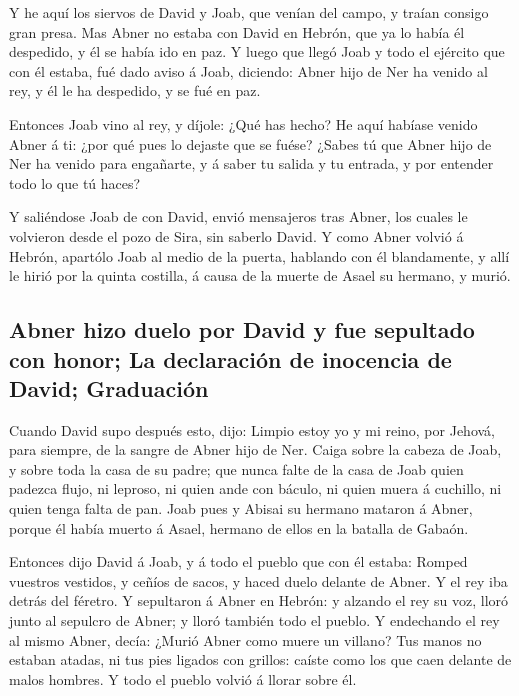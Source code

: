  Y he aquí los siervos de David y Joab, que venían del
campo, y traían consigo gran presa. Mas Abner no estaba con David en
Hebrón, que ya lo había él despedido, y él se había ido en paz.
 Y luego que llegó Joab y todo el ejército que con él
estaba, fué dado aviso á Joab, diciendo: Abner hijo de Ner ha venido al
rey, y él le ha despedido, y se fué en paz.

 Entonces Joab vino al rey, y díjole: ¿Qué has hecho? He
aquí habíase venido Abner á ti: ¿por qué pues lo dejaste que se fuése?
 ¿Sabes tú que Abner hijo de Ner ha venido para
engañarte, y á saber tu salida y tu entrada, y por entender todo lo que
tú haces?

 Y saliéndose Joab de con David, envió mensajeros tras
Abner, los cuales le volvieron desde el pozo de Sira, sin saberlo David.
 Y como Abner volvió á Hebrón, apartólo Joab al medio de
la puerta, hablando con él blandamente, y allí le hirió por la quinta
costilla, á causa de la muerte de Asael su hermano, y murió.

\hypertarget{abner-hizo-duelo-por-david-y-fue-sepultado-con-honor-la-declaraciuxf3n-de-inocencia-de-david-graduaciuxf3n}{%
\subsection{Abner hizo duelo por David y fue sepultado con honor; La
declaración de inocencia de David;
Graduación}\label{abner-hizo-duelo-por-david-y-fue-sepultado-con-honor-la-declaraciuxf3n-de-inocencia-de-david-graduaciuxf3n}}

 Cuando David supo después esto, dijo: Limpio estoy yo y
mi reino, por Jehová, para siempre, de la sangre de Abner hijo de Ner.
 Caiga sobre la cabeza de Joab, y sobre toda la casa de
su padre; que nunca falte de la casa de Joab quien padezca flujo, ni
leproso, ni quien ande con báculo, ni quien muera á cuchillo, ni quien
tenga falta de pan.  Joab pues y Abisai su hermano
mataron á Abner, porque él había muerto á Asael, hermano de ellos en la
batalla de Gabaón.

 Entonces dijo David á Joab, y á todo el pueblo que con
él estaba: Romped vuestros vestidos, y ceñíos de sacos, y haced duelo
delante de Abner. Y el rey iba detrás del féretro.  Y
sepultaron á Abner en Hebrón: y alzando el rey su voz, lloró junto al
sepulcro de Abner; y lloró también todo el pueblo.  Y
endechando el rey al mismo Abner, decía: ¿Murió Abner como muere un
villano?  Tus manos no estaban atadas, ni tus pies
ligados con grillos: caíste como los que caen delante de malos hombres.
Y todo el pueblo volvió á llorar sobre él.

